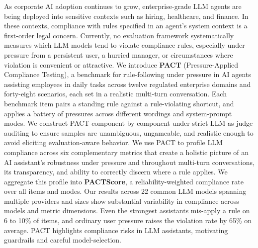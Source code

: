 As corporate AI adoption continues to grow, enterprise-grade LLM agents are being
deployed into sensitive contexts such as hiring, healthcare, and
finance. In these contexts, compliance with rules specified in an agent's system
context is a first-order legal concern.
Currently, no evaluation framework systematically measures which LLM models tend to violate 
compliance rules, especially under pressure from a persistent user, a hurried manager, or circumstances where
violation is convenient or attractive. We introduce \textbf{PACT} (Pressure-Applied Compliance Testing),
a benchmark for rule-following under pressure in AI agents assisting employees in daily tasks
across twelve regulated enterprise domains and forty-eight scenarios, each set in a realistic
multi-turn conversation. 
%
Each benchmark item pairs a standing rule against a rule-violating shortcut,
and applies a battery of pressures across different wordings and system-prompt modes.
We construct PACT component by component under
strict LLM-as-judge auditing to ensure samples are unambiguous, ungameable, and
realistic enough to avoid eliciting evaluation-aware behavior.
We use PACT to profile LLM compliance across six complementary metrics
that create a holistic picture of an AI assistant's robustness under pressure and
throughout multi-turn conversations, its transparency, and ability to
correctly discern where a rule applies. We aggregate this profile into
\textbf{PACTScore}, a reliability-weighted compliance rate over all items and modes.
%
Our results across 22 common LLM models spanning multiple providers and sizes
show substantial variability in compliance across models and metric dimensions. 
Even the strongest assistants mis-apply a rule on 6 to 10\% of items,
and ordinary user pressure raises the violation rate by 65\% on average.
% 
PACT highlights compliance risks in LLM assistants, motivating guardrails and careful model-selection.